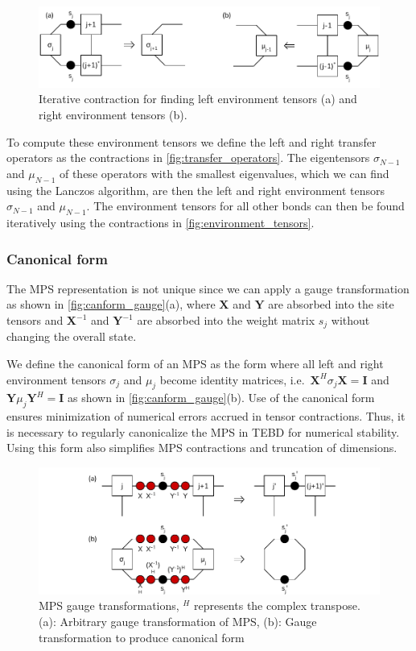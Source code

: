 \documentclass[a4paper, headsepline, footheight=13.6pt]{scrartcl}
\begin{document}
\begin{figure}[htbp]
    \centering
    \includegraphics[width=\textwidth]{figures/environment_tensors.pdf}
    \caption{Iterative contraction for finding left environment tensors (a) and right environment tensors (b).}
    \label{fig:environment_tensors}
\end{figure}

To compute these environment tensors we define the left and right transfer operators as the contractions in \autoref{fig:transfer_operators}. The eigentensors $\sigma_{N-1}$ and $\mu_{N-1}$ of these operators with the smallest eigenvalues, which we can find using the Lanczos algorithm, are then the left and right environment tensors $\sigma_{N-1}$ and $\mu_{N-1}$. The environment tensors for all other bonds can then be found iteratively using the contractions in \autoref{fig:environment_tensors}.

\subsubsection{Canonical form}
The MPS representation is not unique since we can apply a gauge transformation as shown in \autoref{fig:canform_gauge}(a), where $\mathbf{X}$ and $\mathbf{Y}$ are absorbed into the site tensors and $\mathbf{X}^{-1}$ and $\mathbf{Y}^{-1}$ are absorbed into the weight matrix $s_j$ without changing the overall state.

We define the canonical form of an MPS as the form where all left and right environment tensors $\sigma_j$ and $\mu_j$ become identity matrices, i.e.\ $\mathbf{X}^H\sigma_j \mathbf{X} = \mathbf{I}$ and $\mathbf{Y}\mu_j \mathbf{Y}^H = \mathbf{I}$ as shown in \autoref{fig:canform_gauge}(b). Use of the canonical form ensures minimization of numerical errors accrued in tensor contractions. Thus, it is necessary to regularly canonicalize the MPS in TEBD for numerical stability. Using this form also simplifies MPS contractions and truncation of dimensions.

\begin{figure}[htbp]
    \centering
    \includegraphics[width=\textwidth]{figures/canonical_form_gauge_transform.pdf}
    \caption{MPS gauge transformations, $^H$ represents the complex transpose. (a): Arbitrary gauge transformation of MPS, (b): Gauge transformation to produce canonical form}
    \label{fig:canform_gauge}
\end{figure}
\end{document}
